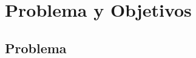 \documentclass[10pt]{beamer}
\newcommand{\1}{
	\setbeamertemplate{background}{
		\texttt{[image: img/1]}
		\tikz[overlay] \fill[fill opacity=0.75,fill=white] (0,0) rectangle (-\paperwidth,\paperheight);
	}
}
\begin{document}
\section{Problema y Objetivos}

\subsection{Problema}
\end{document}
